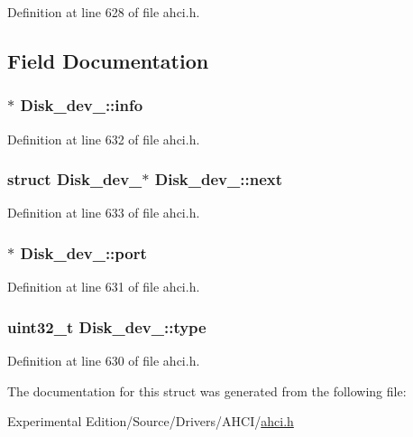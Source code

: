 Definition at line 628 of file ahci.\+h.



\subsection{Field Documentation}
\subsubsection[{\texorpdfstring{info}{info}}]{$\ast$ Disk\+\_\+dev\+\_\+\+::info}\hypertarget{structDisk__dev___a52e2a9b907b950dd16310e9580a43424}{}\label{structDisk__dev___a52e2a9b907b950dd16310e9580a43424}


Definition at line 632 of file ahci.\+h.

\subsubsection[{\texorpdfstring{next}{next}}]{\setlength{\rightskip}{0pt plus 5cm}struct {\bf Disk\+\_\+dev\+\_\+}$\ast$ Disk\+\_\+dev\+\_\+\+::next}\hypertarget{structDisk__dev___aac658457b32e23e97c219973d3a65fb5}{}\label{structDisk__dev___aac658457b32e23e97c219973d3a65fb5}


Definition at line 633 of file ahci.\+h.

\subsubsection[{\texorpdfstring{port}{port}}]{$\ast$ Disk\+\_\+dev\+\_\+\+::port}\hypertarget{structDisk__dev___acdebd9b96abc7fbf3f115417afc7a887}{}\label{structDisk__dev___acdebd9b96abc7fbf3f115417afc7a887}


Definition at line 631 of file ahci.\+h.

\subsubsection[{\texorpdfstring{type}{type}}]{\setlength{\rightskip}{0pt plus 5cm}uint32\+\_\+t Disk\+\_\+dev\+\_\+\+::type}\hypertarget{structDisk__dev___a89cfdf098591b267dfc55bd79a8e3335}{}\label{structDisk__dev___a89cfdf098591b267dfc55bd79a8e3335}


Definition at line 630 of file ahci.\+h.



The documentation for this struct was generated from the following file\+:\begin{DoxyCompactItemize}
\item 
Experimental Edition/\+Source/\+Drivers/\+A\+H\+C\+I/\hyperlink{ahci_8h}{ahci.\+h}\end{DoxyCompactItemize}
